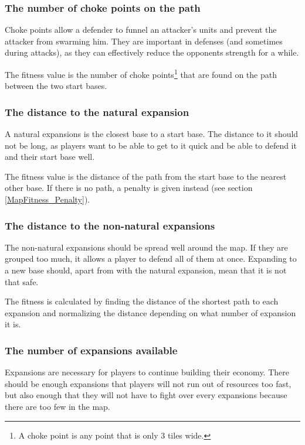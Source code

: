 	\subsubsection*{The number of choke points on the path}
	Choke points allow a defender to funnel an attacker's units and prevent the attacker from swarming him. They are important in defenses (and sometimes during attacks), as they can effectively reduce the opponents strength for a while. 

	The fitness value is the number of choke points\footnote{A choke point is any point that is only 3 tiles wide.} that are found on the path between the two start bases.

	\subsubsection*{The distance to the natural expansion}
	A natural expansions is the closest base to a start base. The distance to it should not be long, as players want to be able to get to it quick and be able to defend it and their start base well. 

	The fitness value is the distance of the path from the start base to the nearest other base. If there is no path, a penalty is given instead (see section \ref{MapFitness_Penalty}).

	\subsubsection*{The distance to the non-natural expansions}
	The non-natural expansions should be spread well around the map. If they are grouped too much, it allows a player to defend all of them at once. Expanding to a new base should, apart from with the natural expansion, mean that it is not that safe. 

	The fitness is calculated by finding the distance of the shortest path to each expansion and normalizing the distance depending on what number of expansion it is.

	\subsubsection*{The number of expansions available}
	Expansions are necessary for players to continue building their economy. There should be enough expansions that players will not run out of resources too fast, but also enough that they will not have to fight over every expansions because there are too few in the map. 

